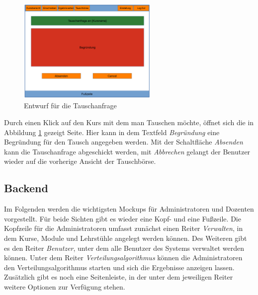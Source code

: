             \begin{figure}[t]
            	\centering
            	\includegraphics[width=0.6\textwidth]{./design/images/MockUpsFrontend/frontendSwap2.png}
            	\caption{Entwurf für die Tauschanfrage}
            	\label{fig:mockupResultsSwap2}
            \end{figure}
            
            Durch einen Klick auf den Kurs mit dem man Tauschen möchte, öffnet sich die in Abbildung \ref{fig:mockupResultsSwap2} gezeigt Seite.
            Hier kann in dem Textfeld \textit{Begründung} eine Begründung für den Tausch angegeben werden.
            Mit der Schaltfläche \textit{Absenden} kann die Tauschanfrage abgeschickt werden, mit \textit{Abbrechen} gelangt der Benutzer wieder auf die vorherige Ansicht der Tauschbörse.
            
            
            
        
            
            
    
        \subsection{Backend}
	        Im Folgenden werden die wichtigsten Mockups für Administratoren und Dozenten vorgestellt.
	        Für beide Sichten gibt es wieder eine Kopf- und eine Fußzeile.
	        Die Kopfzeile für die Administratoren umfasst zunächst einen Reiter \textit{Verwalten}, in dem Kurse, Module und Lehrstühle angelegt werden können.
	        Des Weiteren gibt es den Reiter \textit{Benutzer}, unter dem alle Benutzer des Systems verwaltet werden können.
	        Unter dem Reiter \textit{Verteilungsalgorithmus} können die Administratoren den Verteilungsalgorithmus starten und sich die Ergebnisse anzeigen lassen.
	        Zusätzlich gibt es noch eine Seitenleiste, in der unter dem jeweiligen Reiter weitere Optionen zur Verfügung stehen.
        	
